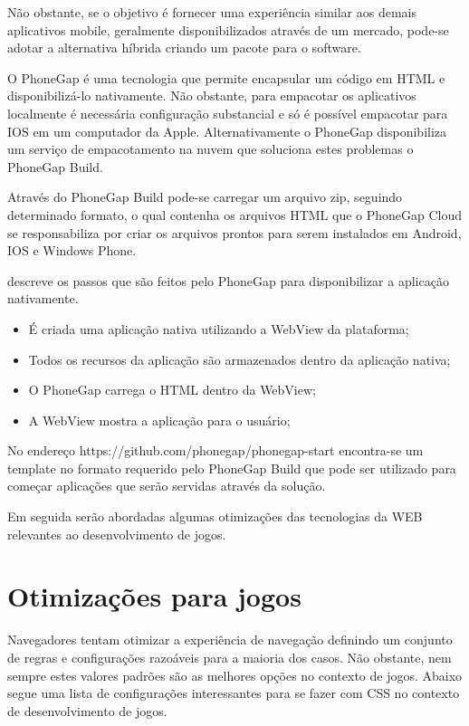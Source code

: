 Não obstante, se o objetivo é fornecer uma experiência similar aos
demais aplicativos mobile, geralmente disponibilizados através de um mercado,
pode-se adotar a alternativa híbrida criando um pacote para o software.

O PhoneGap é uma tecnologia que permite encapsular um código em
HTML e disponibilizá-lo nativamente. Não obstante, para empacotar
os aplicativos localmente é necessária configuração substancial
e só é possível empacotar para IOS em um computador da Apple.
Alternativamente o PhoneGap disponibiliza um serviço de empacotamento
na nuvem que soluciona estes problemas o PhoneGap Build.

Através do PhoneGap Build pode-se carregar um arquivo zip, seguindo
determinado formato, o qual contenha os arquivos HTML que o
PhoneGap Cloud se responsabiliza por criar os arquivos prontos
para serem instalados em Android, IOS e Windows Phone.

\cite{publishHtml5} descreve os passos que são feitos pelo PhoneGap para 
disponibilizar a aplicação nativamente.

\begin{itemize}
\item É criada uma aplicação nativa utilizando a WebView da plataforma;
\item Todos os recursos da aplicação são armazenados dentro da aplicação nativa;
\item O PhoneGap carrega o HTML dentro da WebView;
\item A WebView mostra a aplicação para o usuário;
\end{itemize}

No endereço https://github.com/phonegap/phonegap-start encontra-se um
template no formato requerido pelo PhoneGap Build que pode ser utilizado
para começar aplicações que serão servidas através da solução.

Em seguida serão abordadas algumas otimizações das tecnologias 
da WEB relevantes ao desenvolvimento de jogos.

\section{Otimizações para jogos}

Navegadores tentam otimizar a experiência de navegação definindo
um conjunto de regras e configurações razoáveis para a maioria dos
casos. Não obstante, nem sempre estes valores padrões são as melhores
opções no contexto de jogos. Abaixo segue uma lista de configurações
interessantes para se fazer com CSS no contexto de desenvolvimento de
jogos.

